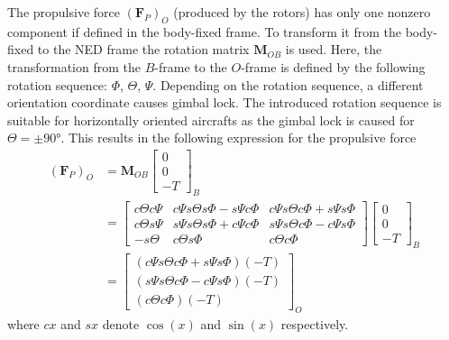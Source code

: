 \documentclass[11pt, a4paper, twoside]{report}
\begin{document}
The propulsive force $(\bm{F}_P)_O$ (produced by the rotors) has only one nonzero component if defined in the body-fixed frame. To transform it from the body-fixed to the \acrshort{NED} frame the rotation matrix $\bm{M}_{OB}$ is used. Here, the transformation from the $B$-frame to the $O$-frame is defined by the following rotation sequence: $\Phi$, $\Theta$, $\Psi$. Depending on the  rotation sequence, a different orientation coordinate causes gimbal lock. The introduced rotation sequence is suitable for horizontally oriented aircrafts as the gimbal lock is caused for $\Theta = \pm\ang{90}$. This results in the following expression for the propulsive force 
\begin{equation}
	\begin{split}
		(\bm{F}_P)_O &= \bm{M}_{OB}
		\begin{bmatrix}
			0\\
			0\\
			-T
		\end{bmatrix}_B \\ 
		&= 
		\begin{bmatrix}
			c\Theta c\Psi & c\Psi s\Theta s\Phi - s\Psi c\Phi & c\Psi s\Theta c\Phi + s\Psi s\Phi\\
			c\Theta s\Psi & s\Psi s\Theta s\Phi + c\Psi c\Phi & s\Psi s\Theta c\Phi - c\Psi s\Phi\\
			-s\Theta & c\Theta s\Phi & c\Theta c\Phi
		\end{bmatrix}
		\begin{bmatrix}
			0\\
			0\\
			-T
		\end{bmatrix}_B \\
		&= 
		\begin{bmatrix}
			(c\Psi s\Theta c\Phi + s\Psi s\Phi)(-T) \\
			(s\Psi s\Theta c\Phi - c\Psi s\Phi)(-T) \\
			(c\Theta c\Phi)(-T)
		\end{bmatrix}_O
		\label{eq:Fp}
	\end{split}
\end{equation}
where $cx$ and $sx$ denote $\cos(x)$ and $\sin(x)$ respectively.
\end{document}
